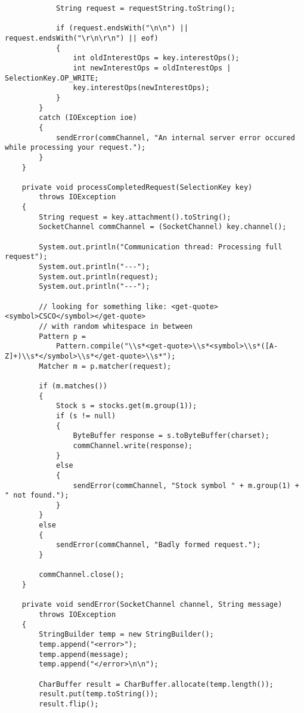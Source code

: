 \documentclass[a4paper,10pt]{article}
\begin{document}
\begin{verbatim}
            String request = requestString.toString();

            if (request.endsWith("\n\n") || request.endsWith("\r\n\r\n") || eof)
            {
                int oldInterestOps = key.interestOps(); 
                int newInterestOps = oldInterestOps | SelectionKey.OP_WRITE;
                key.interestOps(newInterestOps);
            }
        }
        catch (IOException ioe)
        {
            sendError(commChannel, "An internal server error occured while processing your request.");
        }
    }

    private void processCompletedRequest(SelectionKey key)
        throws IOException
    {
        String request = key.attachment().toString();
        SocketChannel commChannel = (SocketChannel) key.channel();

        System.out.println("Communication thread: Processing full request");
        System.out.println("---");
        System.out.println(request);
        System.out.println("---");

        // looking for something like: <get-quote><symbol>CSCO</symbol></get-quote>
        // with random whitespace in between
        Pattern p =
            Pattern.compile("\\s*<get-quote>\\s*<symbol>\\s*([A-Z]+)\\s*</symbol>\\s*</get-quote>\\s*");
        Matcher m = p.matcher(request);

        if (m.matches())
        {
            Stock s = stocks.get(m.group(1));
            if (s != null)
            {
                ByteBuffer response = s.toByteBuffer(charset);
                commChannel.write(response);
            }
            else
            {
                sendError(commChannel, "Stock symbol " + m.group(1) + " not found.");
            }
        }
        else
        {
            sendError(commChannel, "Badly formed request.");
        }

        commChannel.close();
    }

    private void sendError(SocketChannel channel, String message)
        throws IOException
    {
        StringBuilder temp = new StringBuilder();
        temp.append("<error>");
        temp.append(message);
        temp.append("</error>\n\n");

        CharBuffer result = CharBuffer.allocate(temp.length());
        result.put(temp.toString());
        result.flip();


\end{verbatim}
\end{document}

